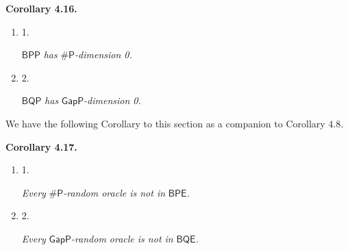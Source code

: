 



\par\medskip\noindent\textbf{
\textbf{Corollary 4.16}\textbf{.}
}\par



\begin{enumerate}


\item[] 
1. 


$\mathsf{BPP}$\emph{ has }${\mathsf{\#}\mathsf{P}}$\emph{-dimension 0.}\par





\item[] 
2. 


$\mathsf{BQP}$\emph{ has }$\mathsf{GapP}$\emph{-dimension 0.}\par





\end{enumerate}






We have the following Corollary to this section as a companion to Corollary 4.8.\par





\par\medskip\noindent\textbf{
\textbf{Corollary 4.17}\textbf{.}
}\par



\begin{enumerate}


\item[] 
1. 


\emph{Every }${\mathsf{\#}\mathsf{P}}$\emph{-random oracle is not in }$\mathsf{BPE}$\emph{.}\par





\item[] 
2. 


\emph{Every }$\mathsf{GapP}$\emph{-random oracle is not in }$\mathsf{BQE}$\emph{.}\par





\end{enumerate}




